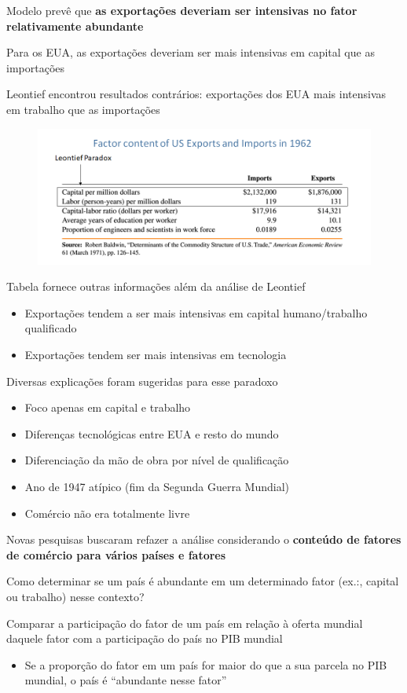 \documentclass[a4paper,12pt]{article}[abntex2]
\begin{document}
Modelo prevê que \textbf{as exportações deveriam ser intensivas no fator relativamente abundante}

Para os EUA, as exportações deveriam ser mais intensivas em capital que as importações

Leontief encontrou resultados contrários: exportações dos EUA mais intensivas em trabalho que as importações

\begin{figure}[H]
    \centering
    \includegraphics[width=0.7\linewidth]{Imagens/a13i1.png}
\end{figure}

Tabela fornece outras informações além da análise de Leontief\begin{itemize}
    \item Exportações tendem a ser mais intensivas em capital humano/trabalho qualificado
    \item Exportações tendem ser mais intensivas em tecnologia
\end{itemize}

Diversas explicações foram sugeridas para esse paradoxo\begin{itemize}
    \item Foco apenas em capital e trabalho
    \item Diferenças tecnológicas entre EUA e resto do mundo
    \item Diferenciação da mão de obra por nível de qualificação
    \item Ano de 1947 atípico (fim da Segunda Guerra Mundial)
    \item Comércio não era totalmente livre
\end{itemize}

Novas pesquisas buscaram refazer a análise considerando o \textbf{conteúdo de fatores de comércio para vários países e fatores}

Como determinar se um país é abundante em um determinado fator (ex.:, capital ou trabalho) nesse contexto?

Comparar a participação do fator de um país em relação à oferta mundial daquele fator com a participação do país no PIB mundial\begin{itemize}
    \item Se a proporção do fator em um país for maior do que a sua parcela no PIB mundial, o país é “abundante nesse fator”
\end{itemize}
\end{document}
